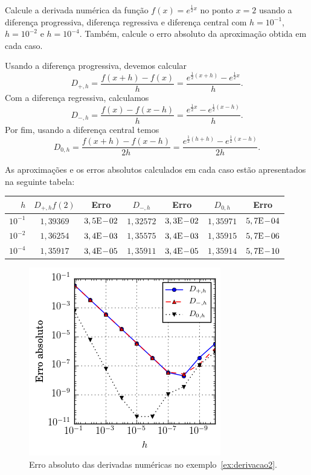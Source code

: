 \begin{ex}\label{ex:derivacao2}
Calcule a derivada numérica da função $f(x)=e^{\frac{1}{2}x}$ no ponto $x=2$ usando a diferença progressiva, diferença regressiva e diferença central com $h=10^{-1}$, $h=10^{-2}$ e $h=10^{-4}$. Também, calcule o erro absoluto da aproximação obtida em cada caso.
\end{ex}
\begin{sol}
  Usando a diferença progressiva, devemos calcular
  \begin{equation*}
    D_{+,h} = \frac{f(x+h) - f(x)}{h} = \frac{e^{\frac{1}{2}(x+h)} - e^{\frac{1}{2}x}}{h}.
  \end{equation*}
  Com a diferença regressiva, calculamos
  \begin{equation*}
    D_{-,h} = \frac{f(x) - f(x-h)}{h} = \frac{e^{\frac{1}{2}x} - e^{\frac{1}{2}(x-h)}}{h}.
  \end{equation*}
  Por fim, usando a diferença central temos
  \begin{equation*}
    D_{0,h} = \frac{f(x+h) - f(x-h)}{2h} = \frac{e^{\frac{1}{2}(h+h)} - e^{\frac{1}{2}(x-h)}}{2h}.
  \end{equation*}

  As aproximações e os erros absolutos calculados em cada caso estão apresentados na seguinte tabela:
  \begin{center}
    \begin{tabular}{r|cc|cc|cc}
      $h$  & $D_{+,h}f(2)$ & Erro & $D_{-,h}$ & Erro & $D_{0,h}$ & Erro \\\hline
      $10^{-1}$ & $1,39369$ & $3,5\mathrm{E}\!-\!02$   & $1,32572$ & $3,3\mathrm{E}\!-\!02$ & $1,35971$ & $5,7\mathrm{E}\!-\!04$\\
      $10^{-2}$ & $1,36254$ & $3,4\mathrm{E}\!-\!03$   & $1,35575$ & $3,4\mathrm{E}\!-\!03$ & $1,35915$ & $5,7\mathrm{E}\!-\!06$\\
      $10^{-4}$ & $1,35917$ & $3,4\mathrm{E}\!-\!05$   & $1,35911$ & $3,4\mathrm{E}\!-\!05$ & $1,35914$ & $5,7\mathrm{E}\!-\!10$\\\hline
    \end{tabular}
  \end{center}
\end{sol}

\begin{figure}
  \centering
  \includegraphics{./cap_derivacao/pics/ex_derivacao2/ex_derivacao2}
  \caption{Erro absoluto das derivadas numéricas no exemplo~\ref{ex:derivacao2}.}
  \label{fig:ex_derivacao2}
\end{figure}


